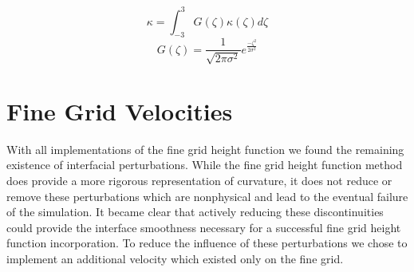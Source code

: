 \begin{equation}
\kappa = \int_{-3}^{3} G(\zeta) \kappa(\zeta) d\zeta
\label{eqn:filt}
\end{equation} 
\begin{equation}
G(\zeta) = \frac{1}{\sqrt{2 \pi \sigma^2}}e^\frac{- \zeta^2}{2\sigma^2}
\label{eqn:G}
\end{equation} 

\section{Fine Grid Velocities}
With all  implementations of the fine grid height function we found the remaining existence of interfacial perturbations. While the fine grid height function method does provide a more rigorous representation of curvature, it does not reduce or remove these perturbations which are nonphysical and lead to the eventual failure of the simulation. It became clear that actively reducing these discontinuities could provide the interface smoothness necessary for a successful fine grid height function incorporation. To reduce the influence of these perturbations we chose to implement an additional velocity which existed only on the fine grid. 

